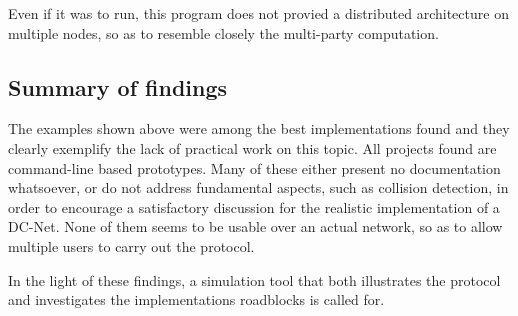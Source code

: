 Even if it was to run, this program does not provied a distributed architecture on multiple nodes, so as to resemble closely the multi-party computation.


\subsection{Summary of findings}
The examples shown above were among the best implementations found and they clearly exemplify the lack of practical work on this topic. All projects found are command-line based prototypes. Many of these either present no documentation whatsoever, or do not address fundamental aspects, such as collision detection, in order to encourage a satisfactory discussion for the realistic implementation of a DC-Net. None of them seems to be usable over an actual network, so as to allow multiple users to carry out the protocol.

In the light of these findings, a simulation tool that both illustrates the protocol and investigates the implementations roadblocks is called for.

